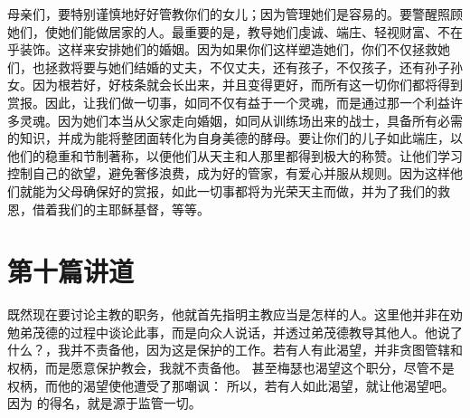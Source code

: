 母亲们，要特别谨慎地好好管教你们的女儿；因为管理她们是容易的。要警醒照顾她们，使她们能做居家的人。最重要的是，教导她们虔诚、端庄、轻视财富、不在乎装饰。这样来安排她们的婚姻。因为如果你们这样塑造她们，你们不仅拯救她们，也拯救将要与她们结婚的丈夫，不仅丈夫，还有孩子，不仅孩子，还有孙子孙女。因为根若好，好枝条就会长出来，并且变得更好，而所有这一切你们都将得到赏报。因此，让我们做一切事，如同不仅有益于一个灵魂，而是通过那一个利益许多灵魂。因为她们本当从父家走向婚姻，如同从训练场出来的战士，具备所有必需的知识，并成为能将整团面转化为自身美德的酵母。要让你们的儿子如此端庄，以他们的稳重和节制著称，以便他们从天主和人那里都得到极大的称赞。让他们学习控制自己的欲望，避免奢侈浪费，成为好的管家，有爱心并服从规则。因为这样他们就能为父母确保好的赏报，如此一切事都将为光荣天主而做，并为了我们的救恩，借着我们的主耶稣基督，等等。\par



\section{ 第十篇讲道}

\par

\par

既然现在要讨论主教的职务，他就首先指明主教应当是怎样的人。这里他并非在劝勉弟茂德的过程中谈论此事，而是向众人说话，并透过弟茂德教导其他人。他说了什么？，我并不责备他，因为这是保护的工作。若有人有此渴望，并非贪图管辖和权柄，而是愿意保护教会，我就不责备他。 甚至梅瑟也渴望这个职分，尽管不是权柄，而他的渴望使他遭受了那嘲讽： 所以，若有人如此渴望，就让他渴望吧。因为  的得名，就是源于监管一切。\par

